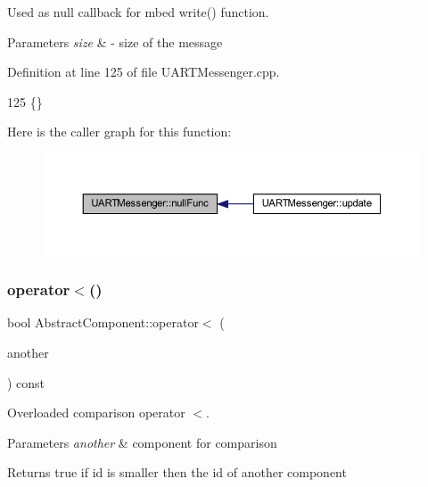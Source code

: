 Used as null callback for mbed write() function. 


\begin{DoxyParams}{Parameters}
{\em size} & -\/ size of the message \\
\hline
\end{DoxyParams}


Definition at line 125 of file U\+A\+R\+T\+Messenger.\+cpp.


\begin{DoxyCode}
125 \{\}
\end{DoxyCode}
Here is the caller graph for this function\+:\nopagebreak
\begin{figure}[H]
\begin{center}
\leavevmode
\includegraphics[width=350pt]{class_u_a_r_t_messenger_a91aa0a571db31d7a0a7f2535a97c30c3_icgraph}
\end{center}
\end{figure}
\mbox{\label{class_abstract_component_a0c2e458144111c5f599c66f168516abc}} 
\subsubsection{\texorpdfstring{operator$<$()}{operator<()}}
{\footnotesize\ttfamily bool Abstract\+Component\+::operator$<$ (\begin{DoxyParamCaption}\item[{const \hyperlink{class_abstract_component}{Abstract\+Component} \&}]{another }\end{DoxyParamCaption}) const\hspace{0.3cm}{\ttfamily [inherited]}}



Overloaded comparison operator \textquotesingle{}$<$\textquotesingle{}. 


\begin{DoxyParams}{Parameters}
{\em another} & component for comparison \\
\hline
\end{DoxyParams}
\begin{DoxyReturn}{Returns}
true if id is smaller then the id of another component 
\end{DoxyReturn}


